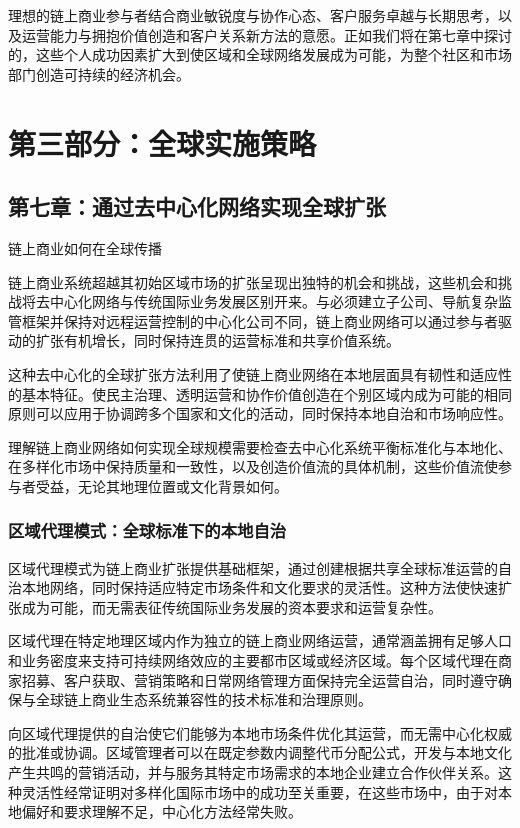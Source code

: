 \documentclass[
  Letterpaper,
]{scrbook}
\begin{document}
理想的链上商业参与者结合商业敏锐度与协作心态、客户服务卓越与长期思考，以及运营能力与拥抱价值创造和客户关系新方法的意愿。正如我们将在第七章中探讨的，这些个人成功因素扩大到使区域和全球网络发展成为可能，为整个社区和市场部门创造可持续的经济机会。

\part{第三部分：全球实施策略}

\chapter{第七章：通过去中心化网络实现全球扩张}\label{sec-global-expansion}

链上商业如何在全球传播

链上商业系统超越其初始区域市场的扩张呈现出独特的机会和挑战，这些机会和挑战将去中心化网络与传统国际业务发展区别开来。与必须建立子公司、导航复杂监管框架并保持对远程运营控制的中心化公司不同，链上商业网络可以通过参与者驱动的扩张有机增长，同时保持连贯的运营标准和共享价值系统。

这种去中心化的全球扩张方法利用了使链上商业网络在本地层面具有韧性和适应性的基本特征。使民主治理、透明运营和协作价值创造在个别区域内成为可能的相同原则可以应用于协调跨多个国家和文化的活动，同时保持本地自治和市场响应性。

理解链上商业网络如何实现全球规模需要检查去中心化系统平衡标准化与本地化、在多样化市场中保持质量和一致性，以及创造价值流的具体机制，这些价值流使参与者受益，无论其地理位置或文化背景如何。

\section{区域代理模式：全球标准下的本地自治}\label{ux533aux57dfux4ee3ux7406ux6a21ux5f0fux5168ux7403ux6807ux51c6ux4e0bux7684ux672cux5730ux81eaux6cbb}

区域代理模式为链上商业扩张提供基础框架，通过创建根据共享全球标准运营的自治本地网络，同时保持适应特定市场条件和文化要求的灵活性。这种方法使快速扩张成为可能，而无需表征传统国际业务发展的资本要求和运营复杂性。

区域代理在特定地理区域内作为独立的链上商业网络运营，通常涵盖拥有足够人口和业务密度来支持可持续网络效应的主要都市区域或经济区域。每个区域代理在商家招募、客户获取、营销策略和日常网络管理方面保持完全运营自治，同时遵守确保与全球链上商业生态系统兼容性的技术标准和治理原则。

向区域代理提供的自治使它们能够为本地市场条件优化其运营，而无需中心化权威的批准或协调。区域管理者可以在既定参数内调整代币分配公式，开发与本地文化产生共鸣的营销活动，并与服务其特定市场需求的本地企业建立合作伙伴关系。这种灵活性经常证明对多样化国际市场中的成功至关重要，在这些市场中，由于对本地偏好和要求理解不足，中心化方法经常失败。
\end{document}
